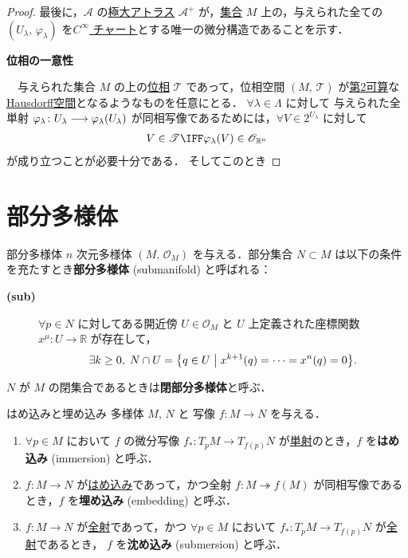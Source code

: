 \documentclass[geometry_main]{subfiles}
\begin{document}
\begin{proof}
	最後に，$\mathcal{A}$ の\hyperref[maxatlas]{極大アトラス} $\mathcal{A}^+$ が，\underline{集合} $M$ 上の，与えられた全ての $(U_\lambda,\, \varphi_\lambda)$ を\hyperref[diffmani]{$C^\infty$ チャート}とする唯一の微分構造であることを示す．

	\item[\textbf{位相の一意性}]　
	
	　与えられた集合 $M$ の上の\hyperref[ax.topo]{位相} $\mathscr{T}$ であって，位相空間 $(M,\, \mathscr{T})$ が\hyperref[def:second-countable]{第2可算}な\hyperref[def:separation]{Hausdorff空間}となるようなものを任意にとる．
	$\forall \lambda \in \Lambda$ に対して
	与えられた全単射 $\varphi_\lambda \colon U_\lambda \longrightarrow \varphi_\lambda(U_\lambda)$ が同相写像であるためには，$\forall V \in 2^{U_\lambda}$ に対して
	\begin{align}
		V \in \mathscr{T} \IFF \varphi_\lambda(V) \in \mathscr{O}_{\mathbb{R}^n}
	\end{align}
	が成り立つことが必要十分である．
	そしてこのとき 
\end{proof}


\section{部分多様体}

\begin{mydef}[label=def.submani]{部分多様体}
	$n$ 次元\cinfty 多様体 $(M,\, \mathscr{O}_M)$ を与える．部分集合 $N \subset M$ は以下の条件を充たすとき\textbf{部分多様体} (submanifold) と呼ばれる：
	\begin{description} 
		\item[\textbf{(sub)}] $\forall p \in N$ に対してある開近傍 $U \in \mathscr{O}_M$ と $U$ 上定義された座標関数 $x^\mu \colon U \to \mathbb{R}$ が存在して，
		\begin{align} 
			\exists k \ge 0,\; N \cap U = \bigl\{ q \in U \bigm| x^{k+1}(q) = \cdots = x^n(q) = 0 \bigr\}.
		\end{align}
	\end{description}
	
	$N$ が $M$ の閉集合であるときは\textbf{閉部分多様体}と呼ぶ．
\end{mydef}

\begin{mydef}[label=def.embedding]{はめ込みと埋め込み}
	\cinfty 多様体 $M,\, N$ と \cinfty 写像 $f \colon M \to N$ を与える．
	\begin{enumerate} 
		\item $\forall p \in M$ において $f$ の微分写像 $f_* \colon T_p M \to T_{f(p)}N$ が\underline{単射}のとき，$f$ を\textbf{はめ込み} (immersion) と呼ぶ．
		\item $f \colon M \to N$ が\underline{はめ込み}であって，かつ全射 $f\colon M \twoheadrightarrow f(M)$ が同相写像であるとき，$f$ を\textbf{埋め込み} (embedding) と呼ぶ．
		\item $f \colon M \to N$ が\underline{全射}であって，かつ $\forall p \in M$ において $f_* \colon T_p M \to T_{f(p)}N$ が\underline{全射}であるとき， $f$ を\textbf{沈め込み} (submersion) と呼ぶ．
	\end{enumerate}
\end{mydef}
\end{document}
